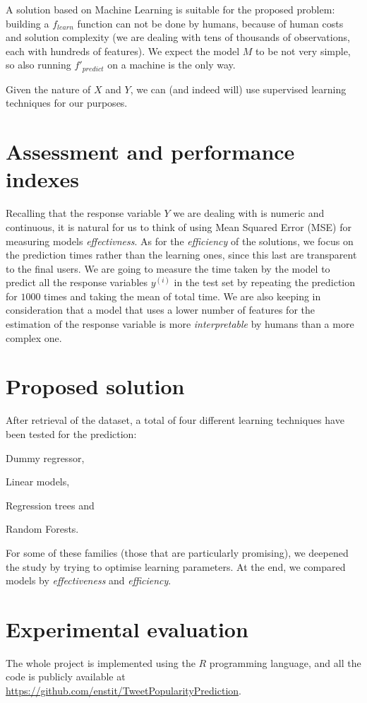 \documentclass[letterpaper,11pt,english,twocolumn]{article}
\begin{document}
A solution based on Machine Learning is suitable for the proposed problem: building a $f_{learn}$ function can not be done by humans, because of human costs and solution complexity (we are dealing with tens of thousands of observations, each with hundreds of features). We expect the model $M$ to be not very simple, so also running $f'_{predict}$ on a machine is the only way.

Given the nature of $X$ and $Y$, we can (and indeed will) use supervised learning techniques for our purposes.


\section{Assessment and performance indexes}
\label{sec:assessment_performance_indexes}
Recalling that the response variable $Y$ we are dealing with is numeric and continuous, it is natural for us to think of using Mean Squared Error (MSE) for measuring models \textit{effectivness}.
As for the \textit{efficiency} of the solutions, we focus on the prediction times rather than the learning ones, since this last are transparent to the final users. We are going to measure the time taken by the model to predict all the response variables $y^{(i)}$ in the test set by repeating the prediction for $1000$ times and taking the mean of total time.
We are also keeping in consideration that a model that uses a lower number of features for the estimation of the response variable is more \textit{interpretable} by humans than a more complex one.

\section{Proposed solution}
\label{sec:solution}
After retrieval of the dataset, a total of four different learning techniques have been tested for the prediction:
\begin{enumerate*}[label=(\roman*)]
	\item Dummy regressor,
	\item Linear models,
	\item Regression trees and
	\item Random Forests.
\end{enumerate*}
For some of these families (those that are particularly promising), we deepened the study by trying to optimise learning parameters.
At the end, we compared models by \textit{effectiveness} and \textit{efficiency}.


\section{Experimental evaluation}
\label{sec:experimental_evaluation}
The whole project is implemented using the $R$ programming language, and all the code is publicly available at \url{https://github.com/enstit/TweetPopularityPrediction}.
\end{document}
